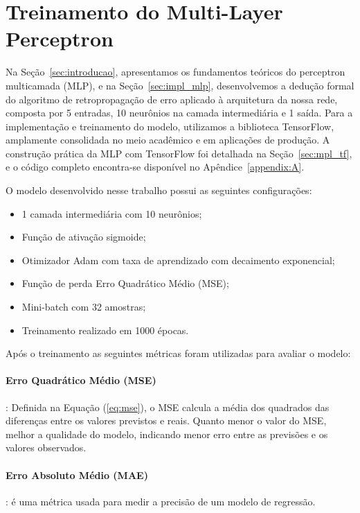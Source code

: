 \documentclass[12pt,a4paper,oneside]{report}
\begin{document}
	\section{Treinamento do Multi-Layer Perceptron}
	
	Na Seção~\ref{sec:introducao}, apresentamos os fundamentos teóricos do perceptron multicamada (MLP), e na Seção~\ref{sec:impl_mlp}, desenvolvemos a dedução formal do algoritmo de retropropagação de erro aplicado à arquitetura da nossa rede, composta por 5 entradas, 10 neurônios na camada intermediária e 1 saída. Para a implementação e treinamento do modelo, utilizamos a biblioteca TensorFlow, amplamente consolidada no meio acadêmico e em aplicações de produção. A construção prática da MLP com TensorFlow foi detalhada na Seção~\ref{sec:mpl_tf}, e o código completo encontra-se disponível no Apêndice~\ref{appendix:A}.
	
	O modelo desenvolvido nesse trabalho possui as seguintes configura\c{c}\~oes:
	\begin{itemize}
		\item 1 camada intermediária com 10 neurônios;
		\item Função de ativa\c{c}\~ao sigmoide;
		\item Otimizador Adam com taxa de aprendizado com decaimento exponencial;
		\item Função de perda Erro Quadrático Médio (MSE);
		\item Mini-batch com 32 amostras;
		\item Treinamento realizado em 1000 épocas.
	\end{itemize}
	
	Após o treinamento as seguintes métricas foram utilizadas para avaliar o modelo:
	
	\paragraph{Erro Quadrático Médio (MSE)}: Definida na Equação (\ref{eq:mse}), o MSE calcula a média dos quadrados das diferenças entre os valores previstos e reais. Quanto menor o valor do MSE, melhor a qualidade do modelo, indicando menor erro entre as previsões e os valores observados.
	
	\paragraph{Erro Absoluto Médio (MAE)}: é uma métrica usada para medir a precisão de um modelo de regressão.
	
\end{document}
